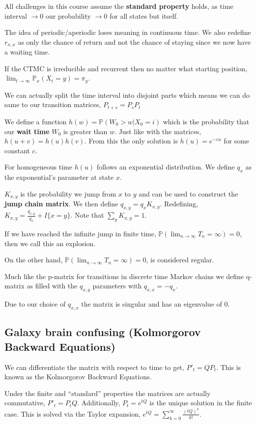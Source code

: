 \documentclass[10pt,landscape,a4paper]{article}
\begin{document}
\begin{multicols*}{4}
All challenges in this course assume the \textbf{standard property} holds,
as time interval $\to 0$ our probability $\to 0$ for all states but itself.

The idea of periodic/aperiodic loses meaning in continuous time. We also
redefine $r_{x,x}$ as only the chance of return and not the chance of staying
since we now have a waiting time.

If the CTMC is irreducible and recurrent then no matter what starting position,
$\lim_{t\to\infty} \mathbb{P}_x(X_t = y) = \pi_y$.

We can actually split the time interval into disjoint parts which means we
can do same to our transition matrices,
$P_{t+s} = P_s P_t$

We define a function $h(w) = \mathbb{P}(W_0 > w | X_0 = i)$ which is the
probability that our \textbf{wait time} $W_0$ is greater than $w$.
Just like with the matrices, $h(u+v) = h(u) h(v)$.
From this the only solution is $h(u) = e^{-cu}$ for some constant $c$.

For homogeneous time $h(u)$ follows an exponential distribution. We define
$q_x$ as the exponential's parameter at state $x$.

$K_{x,y}$ is the probability we jump from $x$ to $y$ and can be used to
construct the \textbf{jump chain matrix}.
We then define $q_{x,y} = q_x K_{x,y}$.
Redefining, $K_{x,y} = \frac{q_{x,y}}{q_x} + I\{x=y\}$.
Note that $\sum_y K_{x,y} = 1$.

If we have reached the infinite jump in finite time,
$\mathbb{P}(\lim_{n\to\infty} T_n = \infty) = 0$, then we call this an explosion.

On the other hand, $\mathbb{P}(\lim_{n\to\infty} T_n = \infty) = 0$, is
considered regular.

Much like the p-matrix for transitions in discrete time Markov chains we define
q-matrix as filled with the $q_{x,y}$ parameters with $q_{x,x} = -q_{x}$.

Due to our choice of $q_{x,x}$ the matrix is singular and has an eigenvalue of 0.

\subsection{Galaxy brain confusing (Kolmorgorov Backward Equations)}
We can differentiate the matrix with respect to time to get,
${P'}_t = Q P_t$. This is known as the Kolmorgorov Backward Equations.

Under the finite and ``standard'' properties the matrices are actually commutative,
${P'}_t = P_t Q$. Additionally, $P_t = e^{tQ}$ is the unique solution in the
finite case. This is solved via the Taylor expansion,
$e^{tQ} = \sum_{k=0}^\infty \frac{(tQ)^k}{k!}$.


\end{multicols*}
\end{document}
